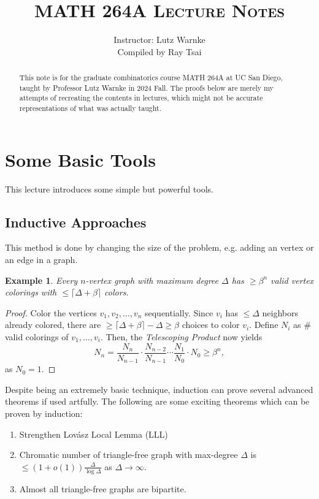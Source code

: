\documentclass[a4paper]{article}
\title{\textsc{MATH 264A Lecture Notes}}
\author{Instructor: Lutz Warnke \\ \small{Compiled by Ray Tsai}}
\date{}
\newtheorem{example}[theorem]{Example}
\begin{document}
\maketitle

\begin{abstract}
  This note is for the graduate combinatorics course MATH 264A at UC San Diego, taught by Professor
  Lutz Warnke in 2024 Fall. The proofs below are merely my attempts of recreating the contents in
  lectures, which might not be accurate representations of what was actually taught. 
\end{abstract}

\section{Some Basic Tools}

This lecture introduces some simple but powerful tools.

\subsection*{Inductive Approaches}

This method is done by changing the size of the problem, e.g. adding an vertex or an edge in a
graph.

\begin{example}
  Every $n$-vertex graph with maximum degree $\Delta$ has $\geq \beta^n$ valid vertex colorings with
  $\leq \lceil \Delta + \beta \rceil$ colors.
\end{example}

\begin{proof}
  Color the vertices $v_1, v_2, \ldots, v_n$ sequentially. Since $v_i$ has $\leq \Delta$ neighbors
  already colored, there are $\geq \lceil \Delta + \beta \rceil - \Delta \geq \beta$ choices to
  color $v_i$. Define $N_i$ as $\#$ valid colorings of $v_1, \ldots, v_i$. Then, the
  \textit{Telescoping Product} now yields
  \[
    N_n = \frac{N_n}{N_{n - 1}} \cdot \frac{N_{n - 2}}{N_{n - 1}} \cdots \frac{N_{1}}{N_{0}} \cdot N_0 \geq \beta^n,
  \]
  as $N_0 = 1$.
\end{proof}

Despite being an extremely basic technique, induction can prove several advanced theorems if used
artfully. The following are some exciting theorems which can be proven by induction:

\begin{enumerate}
  \item Strengthen Lovász Local Lemma (LLL)
  \item Chromatic number of triangle-free graph with max-degree $\Delta$ is $\leq (1 +
  o(1))\frac{\Delta}{\log \Delta}$ as $\Delta \to \infty$.
  \item Almost all triangle-free graphs are bipartite.
\end{enumerate}
\end{document}
